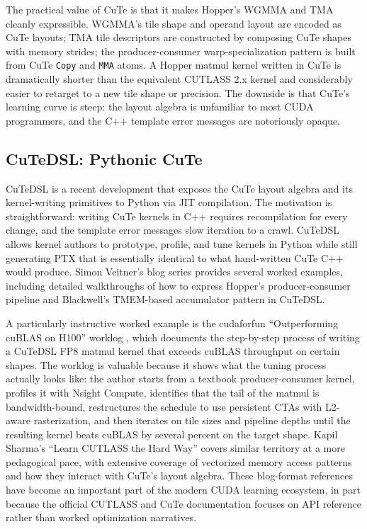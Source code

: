 \documentclass[10pt]{article}
\begin{document}
The practical value of CuTe is that it makes Hopper's WGMMA and TMA cleanly expressible. WGMMA's tile shape and operand layout are encoded as CuTe layouts; TMA tile descriptors are constructed by composing CuTe shapes with memory strides; the producer-consumer warp-specialization pattern is built from CuTe \texttt{Copy} and \texttt{MMA} atoms. A Hopper matmul kernel written in CuTe is dramatically shorter than the equivalent CUTLASS 2.x kernel and considerably easier to retarget to a new tile shape or precision. The downside is that CuTe's learning curve is steep: the layout algebra is unfamiliar to most CUDA programmers, and the C++ template error messages are notoriously opaque.

\subsection{CuTeDSL: Pythonic CuTe}
\label{sec:matmul-cutedsl}

CuTeDSL is a recent development that exposes the CuTe layout algebra and its kernel-writing primitives to Python via JIT compilation. The motivation is straightforward: writing CuTe kernels in C++ requires recompilation for every change, and the template error messages slow iteration to a crawl. CuTeDSL allows kernel authors to prototype, profile, and tune kernels in Python while still generating PTX that is essentially identical to what hand-written CuTe C++ would produce. Simon Veitner's blog series \citep{veitner2025blog,veitner2025blackwell} provides several worked examples, including detailed walkthroughs of how to express Hopper's producer-consumer pipeline and Blackwell's TMEM-based accumulator pattern in CuTeDSL.

A particularly instructive worked example is the cudaforfun ``Outperforming cuBLAS on H100'' worklog \citep{cudaforfun2024}, which documents the step-by-step process of writing a CuTeDSL FP8 matmul kernel that exceeds cuBLAS throughput on certain shapes. The worklog is valuable because it shows what the tuning process actually looks like: the author starts from a textbook producer-consumer kernel, profiles it with Nsight Compute, identifies that the tail of the matmul is bandwidth-bound, restructures the schedule to use persistent CTAs with L2-aware rasterization, and then iterates on tile sizes and pipeline depths until the resulting kernel beats cuBLAS by several percent on the target shape. Kapil Sharma's ``Learn CUTLASS the Hard Way'' \citep{sharma2024cutlass} covers similar territory at a more pedagogical pace, with extensive coverage of vectorized memory access patterns and how they interact with CuTe's layout algebra. These blog-format references have become an important part of the modern CUDA learning ecosystem, in part because the official CUTLASS and CuTe documentation focuses on API reference rather than worked optimization narratives.
\end{document}
